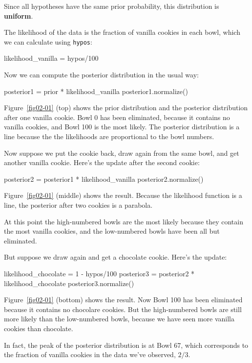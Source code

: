 \documentclass[12pt]{book}
\theoremstyle{exercise}
\newcommand{\py}[1]{{\tt #1}}%
\begin{document}
Since all hypotheses have the same prior probability, this distribution is {\bf uniform}.

The likelihood of the data is the fraction of vanilla cookies in each bowl, which we can calculate using \py{hypos}:

\begin{code}
likelihood_vanilla = hypos/100
\end{code}

Now we can compute the posterior distribution in the usual way:

\begin{code}
posterior1 = prior * likelihood_vanilla
posterior1.normalize()
\end{code}

Figure~\ref{fig02-01} (top) shows the prior distribution and the posterior distribution after one vanilla cookie.
Bowl 0 has been eliminated, because it contains no vanilla cookies, and Bowl 100 is the most likely.
The posterior distribution is a line because the the likelihoods are proportional to the bowl numbers.

Now suppose we put the cookie back, draw again from the same bowl, and get another vanilla cookie.
Here's the update after the second cookie:

\begin{code}
posterior2 = posterior1 * likelihood_vanilla
posterior2.normalize()
\end{code}

Figure~\ref{fig02-01} (middle) shows the result.
Because the likelihood function is a line, the posterior after two cookies is a parabola.

At this point the high-numbered bowls are the most likely because they contain the most vanilla cookies, and the low-numbered bowls have been all but eliminated.

But suppose we draw again and get a chocolate cookie.
Here's the update:

\begin{code}
likelihood_chocolate = 1 - hypos/100
posterior3 = posterior2 * likelihood_chocolate
posterior3.normalize()
\end{code}

Figure~\ref{fig02-01} (bottom) shows the result.
Now Bowl 100 has been eliminated because it contains no chocolare cookies.
But the high-numbered bowls are still more likely than the low-numbered bowls, because we have seen more vanilla cookies than chocolate.

In fact, the peak of the posterior distribution is at Bowl 67, which corresponds to the fraction of vanilla cookies in the data we've observed, $2/3$.
\end{document}
